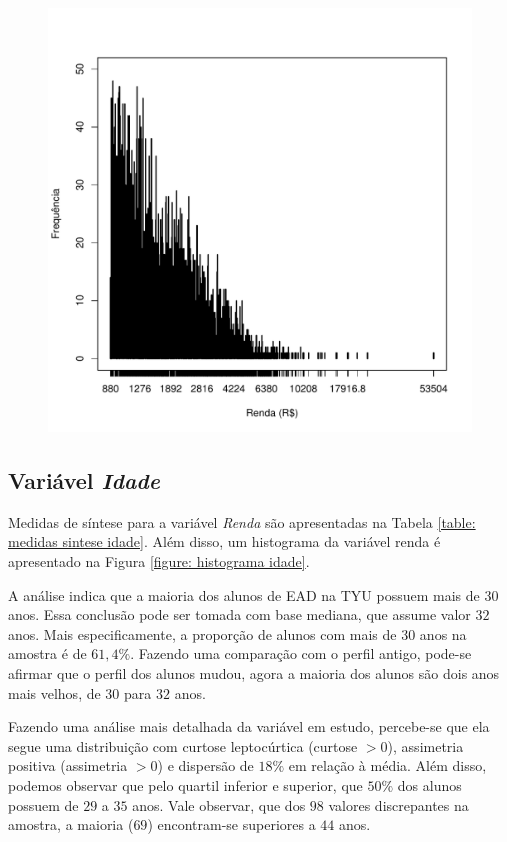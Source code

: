 \documentclass[10pt,a4paper,oneside]{article}
\begin{document}
\begin{figure}[h]
\begin{minipage}{0.46\textwidth}
	\includegraphics[width=\linewidth]{plots/histograma-renda}
	\label{figure: histograma renda}
\end{minipage}
\end{figure}

\clearpage
\subsection*{Variável \textit{Idade}}

Medidas de síntese para a variável \textit{Renda} são apresentadas na Tabela \ref{table: medidas sintese idade}. Além disso, um histograma da variável renda é apresentado na Figura \ref{figure: histograma idade}.

A análise indica que a maioria dos alunos de EAD na TYU possuem mais de $30$ anos. Essa conclusão pode ser tomada com base mediana, que assume valor $32$ anos. Mais especificamente, a proporção de alunos com mais de 30 anos na amostra é de $61,4\%$. Fazendo uma comparação com o perfil antigo, pode-se afirmar que o perfil dos alunos mudou, agora a maioria dos alunos são dois anos mais velhos, de $30$ para $32$ anos.

Fazendo uma análise mais detalhada da variável em estudo, percebe-se que ela segue uma distribuição com curtose leptocúrtica (curtose $> 0$), assimetria positiva (assimetria $> 0$) e dispersão de $18\%$ em relação à média. Além disso, podemos observar que pelo quartil inferior e superior, que $50\%$  dos alunos possuem de $29$ a $35$ anos. Vale observar, que dos $98$ valores discrepantes na amostra, a maioria ($69$) encontram-se superiores a $44$ anos.
\end{document}
